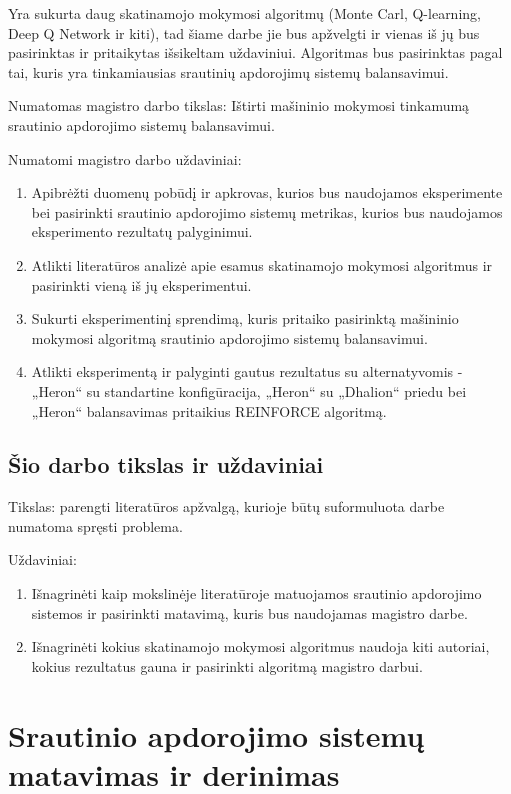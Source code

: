 \documentclass{VUMIFPSbakalaurinis}
\begin{document}
Yra sukurta daug skatinamojo mokymosi algoritmų (Monte Carl, Q-learning, Deep Q Network ir kiti), tad šiame darbe jie bus apžvelgti ir vienas iš jų bus pasirinktas ir pritaikytas išsikeltam uždaviniui. Algoritmas bus pasirinktas pagal tai, kuris yra tinkamiausias srautinių apdorojimų sistemų balansavimui.

Numatomas magistro darbo tikslas: Ištirti mašininio mokymosi tinkamumą srautinio apdorojimo sistemų balansavimui. 

Numatomi magistro darbo uždaviniai:
\begin{enumerate}
    \item Apibrėžti duomenų pobūdį ir apkrovas, kurios bus naudojamos eksperimente bei pasirinkti srautinio apdorojimo sistemų metrikas, kurios bus naudojamos eksperimento rezultatų palyginimui.
    \item Atlikti literatūros analizė apie esamus skatinamojo mokymosi algoritmus ir pasirinkti vieną iš jų eksperimentui. 
    \item Sukurti eksperimentinį sprendimą, kuris pritaiko pasirinktą mašininio mokymosi algoritmą srautinio apdorojimo sistemų balansavimui.
    \item Atlikti eksperimentą ir palyginti gautus rezultatus su alternatyvomis - „Heron“ su standartine konfigūracija, „Heron“ su „Dhalion“ priedu bei „Heron“ balansavimas pritaikius REINFORCE algoritmą. 
\end{enumerate}


\subsection{Šio darbo tikslas ir uždaviniai}
Tikslas: parengti literatūros apžvalgą, kurioje būtų suformuluota darbe numatoma spręsti problema.

Uždaviniai:
\begin{enumerate}
    \item Išnagrinėti kaip mokslinėje literatūroje matuojamos srautinio apdorojimo sistemos ir pasirinkti matavimą, kuris bus naudojamas magistro darbe.
    \item Išnagrinėti kokius skatinamojo mokymosi algoritmus naudoja kiti autoriai, kokius rezultatus gauna ir pasirinkti algoritmą magistro darbui. 
\end{enumerate}

\section{Srautinio apdorojimo sistemų matavimas ir derinimas}
\end{document}
